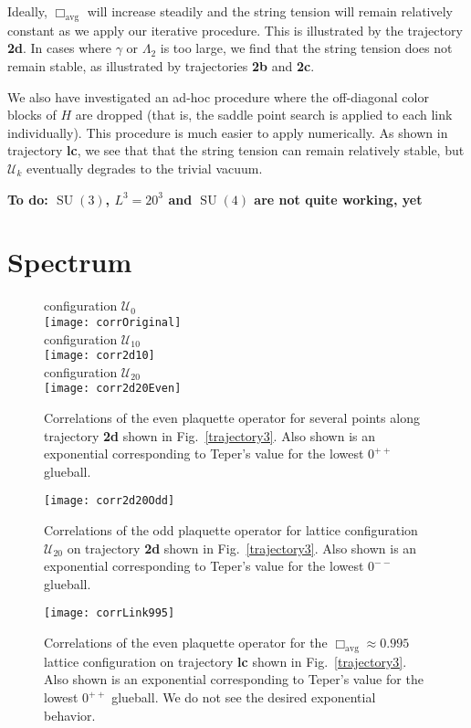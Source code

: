 \documentclass[preprint,aps,prd]{revtex4-2}
\newcommand{\plaquette}{\Box}
\newcommand{\config}{\mathcal{U}}
\DeclareMathOperator{\SU}{SU}
\begin{document}
Ideally, $\plaquette_\mathrm{avg}$ will increase steadily and the string tension will remain relatively constant as we apply our iterative procedure.
This is illustrated by the trajectory {\bf 2d}.
In cases where $\gamma$ or $\Lambda_2$ is too large, we find that the
string tension does not remain stable, as illustrated by
trajectories {\bf 2b} and {\bf 2c}.

We also have investigated an ad-hoc procedure where
the off-diagonal color blocks of $H$ are dropped (that is, the
saddle point search is applied to each link individually).
This procedure is much easier to apply numerically.
As shown in trajectory {\bf lc},
we see that that the string tension can remain relatively stable,
but $\config_k$ eventually degrades to the trivial vacuum.

{\bf  To do:
  $\SU(3)$, $L^3=20^3$ and
  $\SU(4)$ are not quite working, yet}


\section{Spectrum}

\begin{figure}
   configuration $\config_0$\\
   \texttt{[image: corrOriginal]}\\
   configuration $\config_{10}$\\
   \texttt{[image: corr2d10]}\\
   configuration $\config_{20}$\\
   \texttt{[image: corr2d20Even]}
\caption{Correlations of the even plaquette operator for several points
  along trajectory {\bf 2d} shown in Fig.~\ref{trajectory3}.
  Also shown is an exponential corresponding to Teper's value
  for the lowest $0^{++}$ glueball.
  \label{corr2dEven}}
\end{figure}

\begin{figure}
   \texttt{[image: corr2d20Odd]}
   \caption{Correlations of the odd plaquette operator for
     lattice configuration
     $\config_{20}$ on trajectory {\bf 2d} shown in Fig.~\ref{trajectory3}.
  Also shown is an exponential corresponding to Teper's value
  for the lowest $0^{--}$ glueball.
  \label{corr2dOdd}}
\end{figure}

\begin{figure}
   \texttt{[image: corrLink995]}
   \caption{Correlations of the even plaquette operator for
     the $\plaquette_\mathrm{avg} \approx 0.995$ lattice configuration
     on trajectory {\bf lc} shown in Fig.~\ref{trajectory3}.
    Also shown is an exponential corresponding to Teper's value
     for the lowest $0^{++}$ glueball.
     We do not see the desired exponential behavior.
  \label{corrLink995}}
\end{figure}
\end{document}
